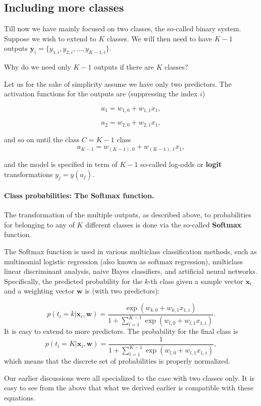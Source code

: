 \documentclass[%
oneside,                 %
final,                   %
10pt]{article}
\newenvironment{question_mdfboxadmon}[1][]{
\begin{question_mdfboxmdframed}[frametitle=#1]
}
{
\end{question_mdfboxmdframed}
}
\begin{document}
\subsection{Including more classes}

Till now we have mainly focused on two classes, the so-called binary
system. Suppose we wish to extend to $K$ classes.  We will then need to have $K-1$ outputs $\boldsymbol{y}_i = \{ y_{1,i}, y_{2,i}, \ldots, y_{K-1,i} \}$. 


\begin{question_mdfboxadmon}[Question]
Why do we need only $K-1$ outputs if there are $K$ classes?
\end{question_mdfboxadmon} %



Let us for the sake of simplicity assume we have only two predictors. The activation functions for the outputs are (suppressing the index $i$)

\[
a_1 = w_{1,0}+w_{1,1}x_1,
\]

\[
a_2 = w_{2,0}+w_{2,1}x_1,
\]

and so on until the class $C=K-1$ class
\[
a_{K-1} = w_{(K-1),0}+w_{(K-1),1}x_1,
\]

and the model is specified in term of $K-1$ so-called log-odds or \textbf{logit} transformations $y_j = y(a_j)$.


\paragraph{Class probabilities: The Softmax function.}
The transformation of the multiple outputs, as described above, to probabilities for belonging to any of $K$ different classes is done via the so-called \textbf{Softmax} function.

The Softmax function is used in various multiclass classification
methods, such as multinomial logistic regression (also known as
softmax regression), multiclass linear discriminant analysis, naive
Bayes classifiers, and artificial neural networks.  Specifically, the predicted probability for the $k$-th class given a sample
vector $\boldsymbol{x}_i$ and a weighting vector $\boldsymbol{w}$ is (with two
predictors):

\[
p(t_i=k\vert \boldsymbol{x}_i,  \boldsymbol{w} ) = \frac{\exp{(w_{k,0}+w_{k,1}x_{1,i})}} {1+\sum_{l=1}^{K-1}\exp{(w_{l,0}+w_{l,1}x_{1,i})}}.
\]
It is easy to extend to more predictors. The probability for the final class is 
\[
p(t_i=K\vert \boldsymbol{x}_i,  \boldsymbol{w} ) = \frac{1} {1+\sum_{l=1}^{K-1}\exp{(w_{l,0}+w_{l,1}x_{1,i})}},
\]
which means that the discrete set of probabilities is properly normalized. 

Our earlier discussions were all specialized to
the case with two classes only. It is easy to see from the above that
what we derived earlier is compatible with these equations.


\end{document}
